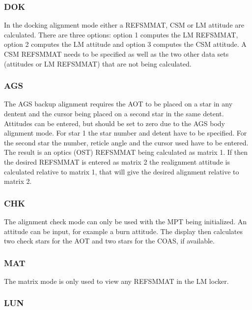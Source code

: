 \documentclass[11pt]{article} %
\begin{document}
\subsubsection{DOK}

In the docking alignment mode either a REFSMMAT, CSM or LM attitude are calculated. There are three options: option 1 computes the LM REFSMMAT, option 2 computes the LM attitude and option 3 computes the CSM attitude. A CSM REFSMMAT needs to be specified as well as the two other data sets (attitudes or LM REFSMMAT) that are not being calculated.\\

\subsubsection{AGS}

The AGS backup alignment requires the AOT to be placed on a star in any dentent and the cursor being placed on a second star in the same detent. Attitudes can be entered, but should be set to zero due to the AGS body alignment mode. For star 1 the star number and detent have to be specified. For the second star the number, reticle angle and the cursor used have to be entered. The result is an optics (OST) REFSMMAT being calculated as matrix 1. If then the desired REFSMMAT is entered as matrix 2 the realignment attitude is calculated relative to matrix 1, that will give the desired alignment relative to matrix 2.\\

\subsubsection{CHK}

The alignment check mode can only be used with the MPT being initialized. An attitude can be input, for example a burn attitude. The display then calculates two check stars for the AOT and two stars for the COAS, if available.\\

\subsubsection{MAT}

The matrix mode is only used to view any REFSMMAT in the LM locker.\\

\subsubsection{LUN}
\end{document}
